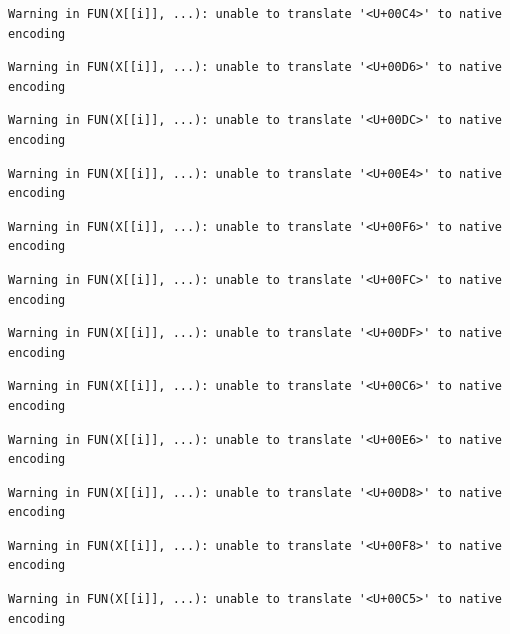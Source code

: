 \documentclass[
  10pt,
  letterpaper,
  DIV=11,
  numbers=noendperiod]{scrartcl}
\begin{document}
\begin{verbatim}
Warning in FUN(X[[i]], ...): unable to translate '<U+00C4>' to native encoding
\end{verbatim}

\begin{verbatim}
Warning in FUN(X[[i]], ...): unable to translate '<U+00D6>' to native encoding
\end{verbatim}

\begin{verbatim}
Warning in FUN(X[[i]], ...): unable to translate '<U+00DC>' to native encoding
\end{verbatim}

\begin{verbatim}
Warning in FUN(X[[i]], ...): unable to translate '<U+00E4>' to native encoding
\end{verbatim}

\begin{verbatim}
Warning in FUN(X[[i]], ...): unable to translate '<U+00F6>' to native encoding
\end{verbatim}

\begin{verbatim}
Warning in FUN(X[[i]], ...): unable to translate '<U+00FC>' to native encoding
\end{verbatim}

\begin{verbatim}
Warning in FUN(X[[i]], ...): unable to translate '<U+00DF>' to native encoding
\end{verbatim}

\begin{verbatim}
Warning in FUN(X[[i]], ...): unable to translate '<U+00C6>' to native encoding
\end{verbatim}

\begin{verbatim}
Warning in FUN(X[[i]], ...): unable to translate '<U+00E6>' to native encoding
\end{verbatim}

\begin{verbatim}
Warning in FUN(X[[i]], ...): unable to translate '<U+00D8>' to native encoding
\end{verbatim}

\begin{verbatim}
Warning in FUN(X[[i]], ...): unable to translate '<U+00F8>' to native encoding
\end{verbatim}

\begin{verbatim}
Warning in FUN(X[[i]], ...): unable to translate '<U+00C5>' to native encoding
\end{verbatim}
\end{document}

